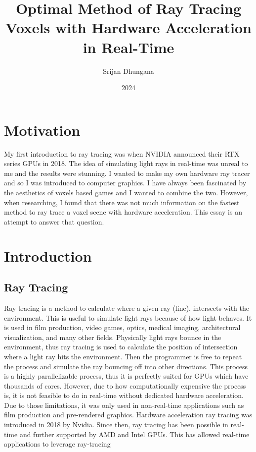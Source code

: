 \documentclass[12pt]{article}
\title{Optimal Method of Ray Tracing Voxels with Hardware Acceleration in Real-Time}
\author{Srijan Dhungana}
\date{2024}
\begin{document}
\maketitle
\clearpage

\tableofcontents
\clearpage

\section{Motivation}

My first introduction to ray tracing was when NVIDIA announced their RTX series GPUs in 2018.
The idea of simulating light rays in real-time was unreal to me and the results were stunning.
I wanted to make my own hardware ray tracer and so I was introduced to computer graphics.
I have always been fascinated by the aesthetics of voxels based games and I wanted to combine the two.
However, when researching, I found that there was not much information on the fastest method to ray trace a voxel scene with hardware acceleration.
This essay is an attempt to answer that question.

\section{Introduction}

\subsection{Ray Tracing}

Ray tracing is a method to calculate where a given ray (line), intersects
with the environment. This is useful to simulate light rays because of how light behaves. It is used in film
production, video games, optics, medical imaging, architectural visualization,
and many other fields. Physically light rays bounce in the environment, thus
ray tracing is used to calculate the position of intersection where a light ray
hits the environment. Then the programmer is free to repeat the process
and simulate the ray bouncing off into other directions. This process is a
highly parallelizable process, thus it is perfectly suited for GPUs which have
thousands of cores. However, due to how computationally expensive the
process is, it is not feasible to do in real-time without dedicated hardware
acceleration. Due to those limitations, it was only used in non-real-time
applications such as film production and pre-rendered graphics. Hardware
acceleration ray tracing was introduced in 2018 by Nvidia. Since then, ray
tracing has been possible in real-time and further supported by AMD and
Intel GPUs. This has allowed real-time applications to leverage ray-tracing
\end{document}
